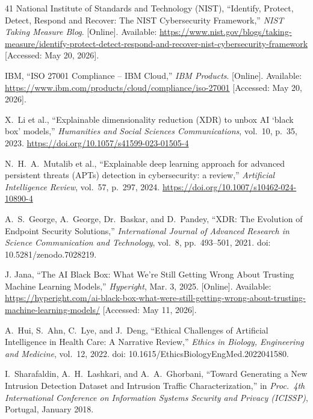 \documentclass[12pt,a4paper]{report}
\begin{document}
\begin{thebibliography}{41}
National Institute of Standards and Technology (NIST),
``Identify, Protect, Detect, Respond and Recover:
The NIST Cybersecurity Framework,''
\textit{NIST Taking Measure Blog}.
[Online]. Available:
\url{https://www.nist.gov/blogs/taking-measure/identify-protect-detect-respond-and-recover-nist-cybersecurity-framework}
[Accessed: May 20, 2026].

IBM,
``ISO 27001 Compliance -- IBM Cloud,''
\textit{IBM Products}.
[Online]. Available:
\url{https://www.ibm.com/products/cloud/compliance/iso-27001}
[Accessed: May 20, 2026].

X.\ Li et al., ``Explainable dimensionality reduction (XDR) to unbox AI `black box' models,''
\textit{Humanities and Social Sciences Communications}, vol.\ 10, p.\ 35, 2023.
\url{https://doi.org/10.1057/s41599-023-01505-4}

N.\ H.\ A.\ Mutalib et al., ``Explainable deep learning approach for advanced persistent
threats (APTs) detection in cybersecurity: a review,'' \textit{Artificial Intelligence Review},
vol.\ 57, p.\ 297, 2024. \url{https://doi.org/10.1007/s10462-024-10890-4}

A.\ S.\ George, A.\ George, Dr.\ Baskar, and D.\ Pandey, ``XDR: The Evolution of Endpoint
Security Solutions,'' \textit{International Journal of Advanced Research in Science
Communication and Technology}, vol.\ 8, pp.\ 493--501, 2021.
doi: 10.5281/zenodo.7028219.

J. Jana,
``The AI Black Box: What We're Still Getting Wrong About Trusting Machine Learning Models,''
\textit{Hyperight}, Mar. 3, 2025.
[Online]. Available:
\url{https://hyperight.com/ai-black-box-what-were-still-getting-wrong-about-trusting-machine-learning-models/}
[Accessed: May 11, 2026].

A.\ Hui, S.\ Ahn, C.\ Lye, and J.\ Deng, ``Ethical Challenges of Artificial Intelligence in Health Care: A Narrative Review,'' \textit{Ethics in Biology, Engineering and Medicine}, vol.\ 12, 2022. doi: 10.1615/EthicsBiologyEngMed.2022041580.


I.\ Sharafaldin, A.\ H.\ Lashkari, and A.\ A.\ Ghorbani, ``Toward Generating a New
Intrusion Detection Dataset and Intrusion Traffic Characterization,'' in \textit{Proc.\ 4th
International Conference on Information Systems Security and Privacy (ICISSP)},
Portugal, January 2018.

\end{thebibliography}
\end{document}
